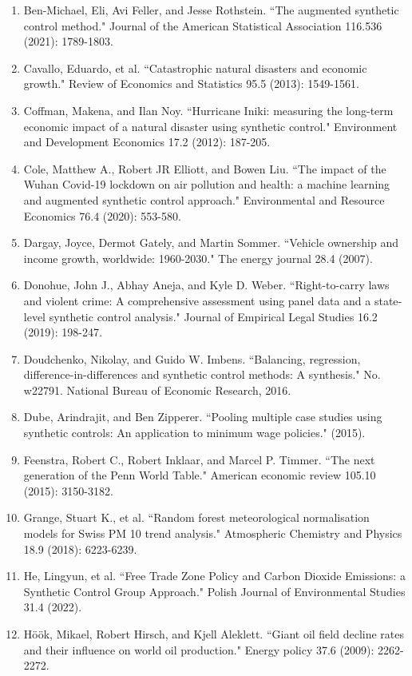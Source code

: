 \documentclass[12pt,a4paper,draft]{article}
\begin{document}
\begin{enumerate}
    \item Ben-Michael, Eli, Avi Feller, and Jesse Rothstein. ``The augmented synthetic control method." Journal of the American Statistical Association 116.536 (2021): 1789-1803.
    \item Cavallo, Eduardo, et al. ``Catastrophic natural disasters and economic growth." Review of Economics and Statistics 95.5 (2013): 1549-1561.
    \item Coffman, Makena, and Ilan Noy. ``Hurricane Iniki: measuring the long-term economic impact of a natural disaster using synthetic control." Environment and Development Economics 17.2 (2012): 187-205.
    \item Cole, Matthew A., Robert JR Elliott, and Bowen Liu. ``The impact of the Wuhan Covid-19 lockdown on air pollution and health: a machine learning and augmented synthetic control approach." Environmental and Resource Economics 76.4 (2020): 553-580.
    \item Dargay, Joyce, Dermot Gately, and Martin Sommer. ``Vehicle ownership and income growth, worldwide: 1960-2030." The energy journal 28.4 (2007).
    \item Donohue, John J., Abhay Aneja, and Kyle D. Weber. ``Right-to-carry laws and violent crime: A comprehensive assessment using panel data and a state‐level synthetic control analysis." Journal of Empirical Legal Studies 16.2 (2019): 198-247.
    \item Doudchenko, Nikolay, and Guido W. Imbens. ``Balancing, regression, difference-in-differences and synthetic control methods: A synthesis." No. w22791. National Bureau of Economic Research, 2016.
    \item Dube, Arindrajit, and Ben Zipperer. ``Pooling multiple case studies using synthetic controls: An application to minimum wage policies." (2015).
    \item Feenstra, Robert C., Robert Inklaar, and Marcel P. Timmer. ``The next generation of the Penn World Table." American economic review 105.10 (2015): 3150-3182.
    \item Grange, Stuart K., et al. ``Random forest meteorological normalisation models for Swiss PM 10 trend analysis." Atmospheric Chemistry and Physics 18.9 (2018): 6223-6239.
    \item He, Lingyun, et al. ``Free Trade Zone Policy and Carbon Dioxide Emissions: a Synthetic Control Group Approach." Polish Journal of Environmental Studies 31.4 (2022).
    \item Höök, Mikael, Robert Hirsch, and Kjell Aleklett. ``Giant oil field decline rates and their influence on world oil production." Energy policy 37.6 (2009): 2262-2272.

\end{enumerate}
\end{document}

